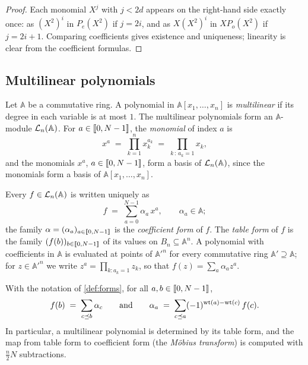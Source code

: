 \begin{proof}
Each monomial $X^j$ with $j < 2d$ appears on the right-hand side exactly once: as $(X^2)^{i}$ in $P_e(X^2)$ if $j = 2i$, and as $X (X^2)^{i}$ in $X P_o(X^2)$ if $j = 2i+1$. Comparing coefficients gives existence and uniqueness; linearity is clear from the coefficient formulas.
\end{proof}

\subsection{Multilinear polynomials}\label{sec:prelim:ml}

Let $\mathbb{A}$ be a commutative ring.
A polynomial in $\mathbb{A}[x_1,\dots,x_n]$ is \emph{multilinear} if its degree in each variable is at most $1$.
The multilinear polynomials form an $\mathbb{A}$-module $\mathcal{L}_n(\mathbb{A})$.
For $a \in \llbracket 0, N-1 \rrbracket$, the \emph{monomial} of index $a$ is
\[
  x^a \;=\; \prod_{k=1}^{n} x_k^{a_k} \;=\; \prod_{k \,:\, a_k = 1} x_k ,
\]
and the monomials $x^a$, $a \in \llbracket 0, N-1 \rrbracket$, form a basis of $\mathcal{L}_n(\mathbb{A})$, since the monomials form a basis of $\mathbb{A}[x_1,\dots,x_n]$.

\begin{definition}\label{def:forms}
Every $f \in \mathcal{L}_n(\mathbb{A})$ is written uniquely as
\[
  f \;=\; \sum_{a=0}^{N-1} \alpha_a\, x^a, \qquad \alpha_a \in \mathbb{A};
\]
the family $\alpha = (\alpha_a)_{a \in \llbracket 0, N-1 \rrbracket}$ is the \emph{coefficient form} of $f$.
The \emph{table form} of $f$ is the family $(f(b))_{b \in \llbracket 0, N-1 \rrbracket}$ of its values on $B_n \subseteq \mathbb{A}^n$.
A polynomial with coefficients in $\mathbb{A}$ is evaluated at points of $\mathbb{A}'^n$ for every commutative ring $\mathbb{A}' \supseteq \mathbb{A}$; for $z \in \mathbb{A}'^n$ we write $z^a = \prod_{k : a_k = 1} z_k$, so that $f(z) = \sum_a \alpha_a z^a$.
\end{definition}

\begin{lemma}\label{lem:mobius}
With the notation of \cref{def:forms}, for all $a, b \in \llbracket 0, N-1 \rrbracket$,
\[
  f(b) \;=\; \sum_{c \preceq b} \alpha_c
  \qquad\text{and}\qquad
  \alpha_a \;=\; \sum_{c \preceq a} (-1)^{\mathrm{wt}(a)-\mathrm{wt}(c)}\, f(c).
\]
In particular, a multilinear polynomial is determined by its table form, and the map from table form to coefficient form (the \emph{M\"obius transform}) is computed with $\tfrac{n}{2}N$ subtractions.
\end{lemma}

